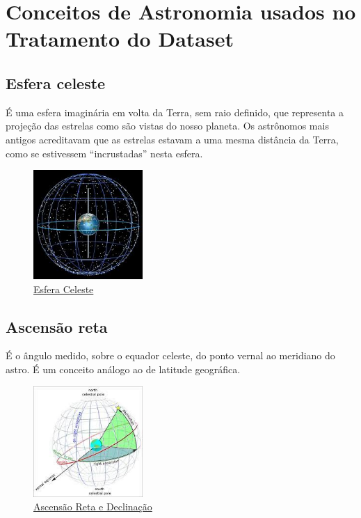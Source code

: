 \documentclass[12pt, a4paper]{article}
\begin{document}
	\section{Conceitos de Astronomia usados no Tratamento do Dataset
	}
	\subsection{Esfera celeste}
	É uma esfera imaginária em volta da Terra, sem raio definido, que representa a projeção das estrelas como são vistas do nosso planeta. Os astrônomos mais antigos acreditavam que as estrelas estavam a uma mesma distância da Terra, como se estivessem “incrustadas” nesta esfera.

	\begin{figure}[h]
		\centering
		\includegraphics[width=0.37\textwidth]{celestial_sphere.png}
		\caption{ \href{https://orionbearastronomy.com/2019/02/05/using-the-celestial-coordinates/}{Esfera Celeste}}
		\label{fig:Esfera_Celeste}
	\end{figure}

	\subsection{Ascensão reta}
	
	É o ângulo medido, sobre o equador celeste, do ponto vernal ao meridiano do astro. É um conceito análogo ao de latitude geográfica.

	\begin{figure}[h]
		\centering
		\includegraphics[width=0.37\textwidth]{right_ascension_and_declination.png}
		\caption{ \href{https://skyandtelescope.org/astronomy-resources/right-ascension-declination-celestial-coordinates/}{Ascensão Reta e Declinação}}
		\label{fig:Ascensão_Reta_e_Declinação}
	\end{figure}
\end{document}
